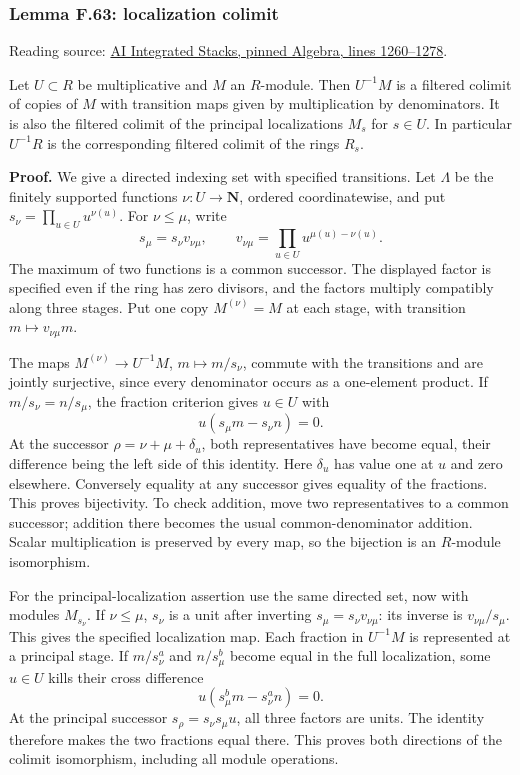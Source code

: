 \documentclass[11pt,a4paper,openany]{report}
\begin{document}
\label{AG-RG-S05-algebra-lemma-localization-colimit}

\subsubsection{Lemma F.63: localization colimit}\label{AG-RG-S05-lemma-f.63-localization-colimit}

Reading source: \href{https://github.com/KokunoYumeto/unofficial-stacks-project-ai-drafts/blob/565b10e987aba5969b21145a0833f42d69f96790/algebra.tex\#L1260-L1278}{AI Integrated Stacks, pinned Algebra, lines 1260--1278}.

Let \(U\subset R\) be multiplicative and \(M\) an \(R\)-module. Then \(U^{-1}M\) is a filtered colimit of copies of \(M\) with transition maps given by multiplication by denominators. It is also the filtered colimit of the principal localizations \(M_s\) for \(s\in U\). In particular \(U^{-1}R\) is the corresponding filtered colimit of the rings \(R_s\).

\textbf{Proof.} We give a directed indexing set with specified transitions. Let \(\Lambda\) be the finitely supported functions \(\nu:U\to\mathbf N\), ordered coordinatewise, and put \(s_\nu=\prod_{u\in U}u^{\nu(u)}\). For \(\nu\leq\mu\), write \[s_\mu=s_\nu v_{\nu\mu},\qquad
v_{\nu\mu}=\prod_{u\in U}u^{\mu(u)-\nu(u)}.\] The maximum of two functions is a common successor. The displayed factor is specified even if the ring has zero divisors, and the factors multiply compatibly along three stages. Put one copy \(M^{(\nu)}=M\) at each stage, with transition \(m\mapsto v_{\nu\mu}m\).

The maps \(M^{(\nu)}\to U^{-1}M\), \(m\mapsto m/s_\nu\), commute with the transitions and are jointly surjective, since every denominator occurs as a one-element product. If \(m/s_\nu=n/s_\mu\), the fraction criterion gives \(u\in U\) with \[u(s_\mu m-s_\nu n)=0.\] At the successor \(\rho=\nu+\mu+\delta_u\), both representatives have become equal, their difference being the left side of this identity. Here \(\delta_u\) has value one at \(u\) and zero elsewhere. Conversely equality at any successor gives equality of the fractions. This proves bijectivity. To check addition, move two representatives to a common successor; addition there becomes the usual common-denominator addition. Scalar multiplication is preserved by every map, so the bijection is an \(R\)-module isomorphism.

For the principal-localization assertion use the same directed set, now with modules \(M_{s_\nu}\). If \(\nu\leq\mu\), \(s_\nu\) is a unit after inverting \(s_\mu=s_\nu v_{\nu\mu}\): its inverse is \(v_{\nu\mu}/s_\mu\). This gives the specified localization map. Each fraction in \(U^{-1}M\) is represented at a principal stage. If \(m/s_\nu^a\) and \(n/s_\mu^b\) become equal in the full localization, some \(u\in U\) kills their cross difference \[u(s_\mu^b m-s_\nu^a n)=0.\] At the principal successor \(s_\rho=s_\nu s_\mu u\), all three factors are units. The identity therefore makes the two fractions equal there. This proves both directions of the colimit isomorphism, including all module operations.
\end{document}
